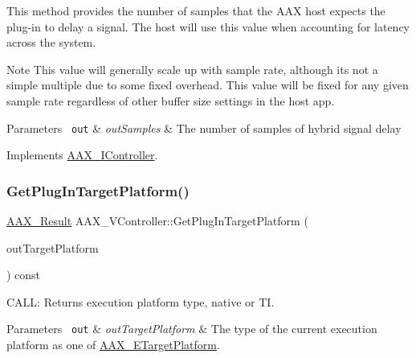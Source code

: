 This method provides the number of samples that the A\+AX host expects the plug-\/in to delay a signal. The host will use this value when accounting for latency across the system.

\begin{DoxyNote}{Note}
This value will generally scale up with sample rate, although it\textquotesingle{}s not a simple multiple due to some fixed overhead. This value will be fixed for any given sample rate regardless of other buffer size settings in the host app.
\end{DoxyNote}

\begin{DoxyParams}[1]{Parameters}
\mbox{\texttt{ out}}  & {\em out\+Samples} & The number of samples of hybrid signal delay \\
\hline
\end{DoxyParams}


Implements \mbox{\hyperlink{a00805_ga47b471c438fcad0798964b860d74609e}{A\+A\+X\+\_\+\+I\+Controller}}.

\mbox{\label{a01905_abb34f17e64d4e50ac8cabf8f47639994}} 
\subsubsection{\texorpdfstring{GetPlugInTargetPlatform()}{GetPlugInTargetPlatform()}}
{\footnotesize\ttfamily \mbox{\hyperlink{a00392_a4d8f69a697df7f70c3a8e9b8ee130d2f}{A\+A\+X\+\_\+\+Result}} A\+A\+X\+\_\+\+V\+Controller\+::\+Get\+Plug\+In\+Target\+Platform (\begin{DoxyParamCaption}\item[{\mbox{\hyperlink{a00392_a8f2cefa455217fa9f3ce190fe5fd8033}{A\+A\+X\+\_\+\+C\+Target\+Platform}} $\ast$}]{out\+Target\+Platform }\end{DoxyParamCaption}) const\hspace{0.3cm}{\ttfamily [virtual]}}



C\+A\+LL\+: Returns execution platform type, native or TI. 


\begin{DoxyParams}[1]{Parameters}
\mbox{\texttt{ out}}  & {\em out\+Target\+Platform} & The type of the current execution platform as one of \mbox{\hyperlink{a00491_a19e8cc27f59bb9bb4039b00fadb3cb83}{A\+A\+X\+\_\+\+E\+Target\+Platform}}. \\
\hline
\end{DoxyParams}


